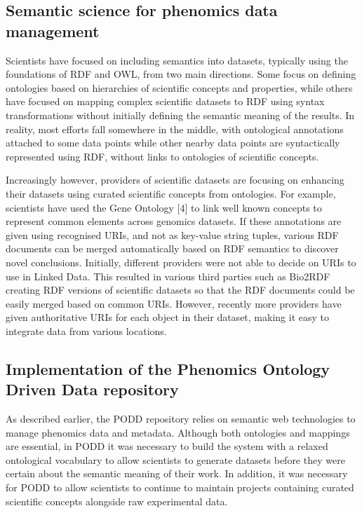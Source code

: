 \documentclass{llncs}
\begin{document}
\subsection{Semantic science for phenomics data management}
Scientists have focused on including semantics into datasets, typically using
the foundations of RDF and OWL, from two main directions. Some focus on defining
ontologies based on hierarchies of scientific concepts and properties, while
others have focused on mapping complex scientific datasets to RDF using syntax
transformations without initially defining the semantic meaning of the results.
In reality, most efforts fall somewhere in the middle, with ontological
annotations attached to some data points while other nearby data points are
syntactically represented using RDF, without links to ontologies of scientific
concepts.


Increasingly however, providers of scientific datasets are focusing on enhancing
their datasets using curated scientific concepts from ontologies. For example,
scientists have used the Gene Ontology [4] to link well known concepts to
represent common elements across genomics datasets. If these annotations are
given using recognised URIs, and not as key-value string tuples, various RDF
documents can be merged automatically based on RDF semantics to discover novel
conclusions. Initially, different providers were not able to decide on URIs to
use in Linked Data. This resulted in various third parties such as Bio2RDF \cite{Belleau2008}
creating RDF versions of scientific datasets so that the RDF documents could be
easily merged based on common URIs. However, recently more providers have given
authoritative URIs for each object in their dataset, making it easy to integrate
data from various locations.


\subsection{Implementation of the Phenomics Ontology Driven Data repository}
As described earlier, the PODD repository relies on semantic web technologies to
manage phenomics data and metadata. Although both ontologies and mappings are
essential, in PODD it was necessary to build the system with a relaxed
ontological vocabulary to allow scientists to generate datasets before they were
certain about the semantic meaning of their work. In addition, it was necessary
for PODD to allow scientists to continue to maintain projects containing curated
scientific concepts alongside raw experimental data. 
\end{document}
